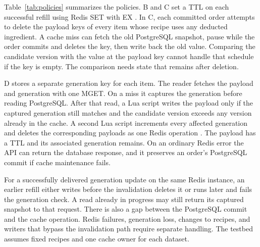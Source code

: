 Table~\ref{tab:policies} summarizes the policies. B and C set a TTL on each successful refill using Redis SET with EX \cite{redisset}. In C, each committed order attempts to delete the payload keys of every item whose recipe uses any deducted ingredient. A cache miss can fetch the old PostgreSQL snapshot, pause while the order commits and deletes the key, then write back the old value. Comparing the candidate version with the value at the payload key cannot handle that schedule if the key is empty. The comparison needs state that remains after deletion.

D stores a separate generation key for each item. The reader fetches the payload and generation with one MGET. On a miss it captures the generation before reading PostgreSQL. After that read, a Lua script writes the payload only if the captured generation still matches and the candidate version exceeds any version already in the cache. A second Lua script increments every affected generation and deletes the corresponding payloads as one Redis operation \cite{redislua}. The payload has a TTL and its associated generation remains. On an ordinary Redis error the API can return the database response, and it preserves an order's PostgreSQL commit if cache maintenance fails.

For a successfully delivered generation update on the same Redis instance, an earlier refill either writes before the invalidation deletes it or runs later and fails the generation check. A read already in progress may still return its captured snapshot to that request. There is also a gap between the PostgreSQL commit and the cache operation. Redis failures, generation loss, changes to recipes, and writers that bypass the invalidation path require separate handling. The testbed assumes fixed recipes and one cache owner for each dataset.
